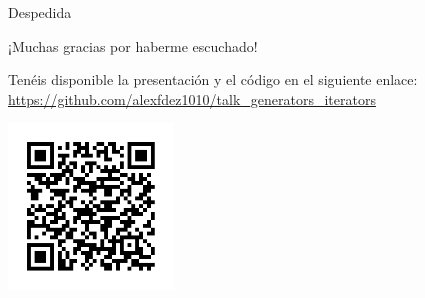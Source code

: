 \documentclass[11pt]{beamer}
\begin{document}
\begin{frame}{Despedida}
    \begin{center}
        ¡Muchas gracias por haberme escuchado! 
    \end{center}
    \begin{center}
        Tenéis disponible la presentación y el código en el siguiente enlace: \url{https://github.com/alexfdez1010/talk_generators_iterators}
    \end{center}
    \begin{center}
        \includegraphics[width=0.33\textwidth]{qr.png}
    \end{center}
\end{frame}
\end{document}
